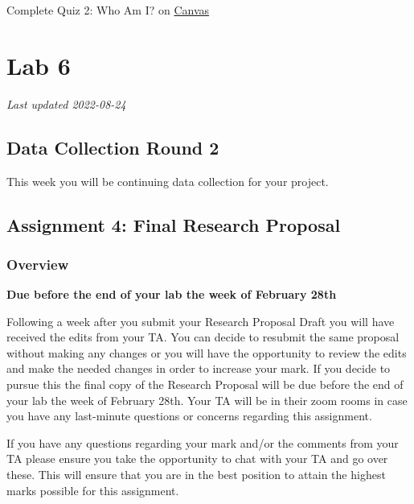\documentclass[
]{book}
\begin{document}
Complete Quiz 2: Who Am I? on \href{https://canvas.ubc.ca/courses/113910}{Canvas}

\hypertarget{part-lab-6}{%
\part*{Lab 6}\label{part-lab-6}}

\emph{Last updated 2022-08-24}

\hypertarget{data-collection-round-2}{%
\chapter*{Data Collection Round 2}\label{data-collection-round-2}}

This week you will be continuing data collection for your project.

\hypertarget{assignment-4-final-research-proposal}{%
\chapter*{Assignment 4: Final Research Proposal}\label{assignment-4-final-research-proposal}}

\hypertarget{overview-2}{%
\section*{Overview}\label{overview-2}}

\textbf{Due before the end of your lab the week of February 28th}

Following a week after you submit your Research Proposal Draft you will have received the edits from your TA. You can decide to resubmit the same proposal without making any changes or you will have the opportunity to review the edits and make the needed changes in order to increase your mark. If you decide to pursue this the final copy of the Research Proposal will be due before the end of your lab the week of February 28th. Your TA will be in their zoom rooms in case you have any last-minute questions or concerns regarding this assignment.

If you have any questions regarding your mark and/or the comments from your TA please ensure you take the opportunity to chat with your TA and go over these. This will ensure that you are in the best position to attain the highest marks possible for this assignment.
\end{document}
